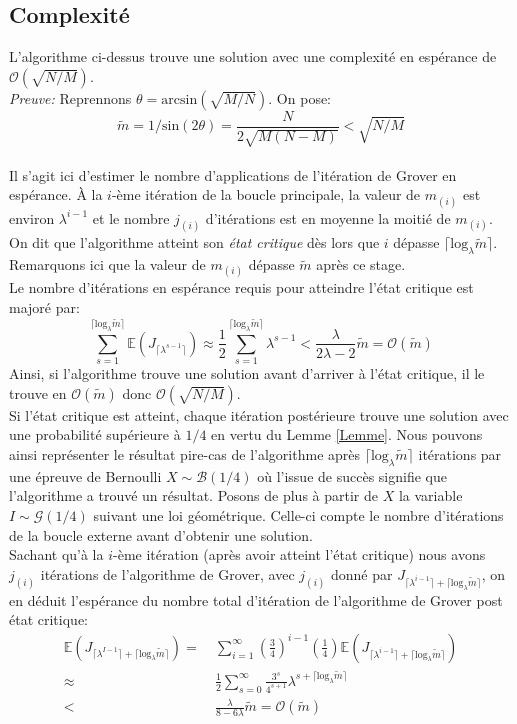 \subsection{Complexité}
L'algorithme ci-dessus trouve une solution avec une complexité en espérance de $\mathcal{O}(\sqrt{N/M})$.
\\
\textit{Preuve:} Reprennons $\theta = \mathrm{arcsin}(\sqrt{M/N})$. On pose: \[\tilde{m} = 1/\mathrm{sin}(2\theta) = \frac{N}{2\sqrt{M(N-M)}} < \sqrt{N/M}\]
\\
Il s'agit ici d'estimer le nombre d'applications de l'itération de Grover en espérance. À la $i$-ème itération de la boucle principale, la valeur de $m_{(i)}$ est environ $\lambda^{i-1}$ et le nombre $j_{(i)}$ d'itérations est en moyenne la moitié de $m_{(i)}$.
On dit que l'algorithme atteint son \textit{état critique} dès lors que $i$ dépasse $\lceil \mathrm{log}_{\lambda}\tilde{m} \rceil$. Remarquons ici que la valeur de $m_{(i)}$ dépasse $\tilde{m}$ après ce stage.
\\
Le nombre d'itérations en espérance requis pour atteindre l'état critique est majoré par:
\[\sum_{s=1}^{\lceil \mathrm{log}_{\lambda}\tilde{m} \rceil} \mathbb{E}(J_{\lceil \lambda^{s-1}\rceil}) \approx \frac{1}{2} \sum_{s=1}^{\lceil \mathrm{log}_{\lambda}\tilde{m} \rceil} \lambda^{s-1} < \frac{\lambda}{2\lambda-2}\tilde{m} = \mathcal{O}(\tilde{m})\]
Ainsi, si l'algorithme trouve une solution avant d'arriver à l'état critique, il le trouve en $\mathcal{O}(\tilde{m})$ donc $\mathcal{O}(\sqrt{N/M})$.
\\
Si l'état critique est atteint, chaque itération postérieure trouve une solution avec une probabilité supérieure à $1/4$ en vertu du Lemme \ref{Lemme}.
Nous pouvons ainsi représenter le résultat pire-cas de l'algorithme après $\lceil \mathrm{log}_{\lambda}\tilde{m} \rceil$ itérations par une épreuve de Bernoulli $X \sim \mathcal{B}(1/4)$ où l'issue de succès signifie que l'algorithme a trouvé un résultat.
Posons de plus à partir de $X$ la variable $I \sim \mathcal{G}(1/4)$ suivant une loi géométrique. Celle-ci compte le nombre d'itérations de la boucle externe avant d'obtenir une solution.
\\
Sachant qu'à la $i$-ème itération (après avoir atteint l'état critique) nous avons $j_{(i)}$ itérations de l'algorithme de Grover, avec $j_{(i)}$ donné par $J_{\lceil \lambda^{i-1}\rceil + \lceil \mathrm{log}_{\lambda}\tilde{m} \rceil}$, on en déduit l'espérance du nombre total d'itération de l'algorithme de Grover post état critique:
\begin{align*}
\mathbb{E}(J_{\lceil \lambda^{I-1}\rceil + \lceil \mathrm{log}_{\lambda}\tilde{m} \rceil})
=&\ \sum_{i=1}^{\infty} \left( \frac{3}{4} \right) ^{i-1} \! \left( \frac{1}{4} \right) \mathbb{E}(J_{\lceil \lambda^{i-1}\rceil + \lceil \mathrm{log}_{\lambda}\tilde{m} \rceil}) \\
\approx&\ \frac{1}{2} \sum_{s=0}^{\infty} \frac{3^s}{4^{s+1}}\lambda^{s+\lceil \mathrm{log}_{\lambda}\tilde{m} \rceil} \\
<&\ \frac{\lambda}{8-6\lambda}\tilde{m} = \mathcal{O}(\tilde{m})
\end{align*}
